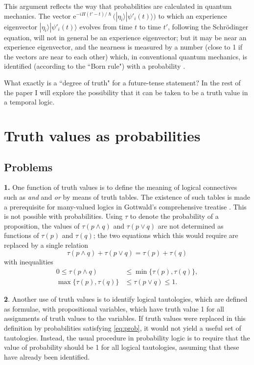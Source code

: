 \documentclass[12pt,reqno]{article}
\renewcommand{\(}{\left(}
\renewcommand{\)}{\right)}
\newcommand{\e}{\mbox{e}}
\renewcommand{\hbar}{\hslash}
\newcommand{\<}{\langle}
\renewcommand{\>}{\rangle}
\newcommand{\be}{\begin{equation}}
\newcommand{\ee}{\end{equation}}
\theoremstyle{plain} %
\begin{document}
This argument reflects the way that probabilities are calculated in quantum mechanics.  The vector $\e^{-iH(t'-t)/\hbar}\big(|\eta_i\>|\psi'_i(t)\>\big)$ to which an experience eigenvector $|\eta_i\>|\psi'_i(t)\>$ evolves from time $t$ to time $t'$, following the Schr\"odinger equation, will not in general be an experience eigenvector; but it may be near an experience eigenvector, and the nearness is measured by a number (close to 1 if the vectors are near to each other) which, in conventional quantum mechanics, is identified (according to the ``Born rule") with a probability .
 
 What exactly is a ``degree of truth" for a future-tense statement? In the rest of the paper I will explore the possibility that it can be taken to be a truth value in a temporal logic.
 


\section{Truth values as probabilities}
\label{probtruth}

\subsection{Problems}
\label{subsec:probprobs}

{\bf 1.} One function of truth values is to define the meaning of logical connectives such as \emph{and} and \emph{or} by means of truth tables. The existence of such tables is made a prerequisite for many-valued logics in Gottwald's comprehensive treatise \cite{Gottwald:manyvalued}. This is not possible with probabilities. Using $\tau$ to denote the probability of a proposition, the values of $\tau(p\land q)$ and $\tau(p\lor q)$ are not determined as functions of $\tau(p)$ and $\tau(q)$; the two equations which this would require are replaced by a single relation
\be\label{eq:prob}
\tau(p\land q) + \tau(p\lor q) = \tau(p) + \tau(q)
\ee
with inequalities
\begin{align}\label{ineq:prob}
0 \le \tau(p\land q) &\le \min\{\tau(p),\tau(q)\},\\
\max\{\tau(p),\tau(q)\} &\le \tau(p\lor q) \le 1.
\end{align}



{\bf 2}. Another use of truth values is to identify logical tautologies, which are defined as formulae, with propositional variables, which have truth value 1 for all assignments of truth values to the variables. If truth values were replaced in this definition by probabilities satisfying \eqref{eq:prob}, it would not yield a useful set of tautologies. Instead, the usual procedure in probability logic \cite{Adams:problogic} is to require that the value of probability should be 1 for all logical tautologies, assuming that these have already been identified.
\end{document}
